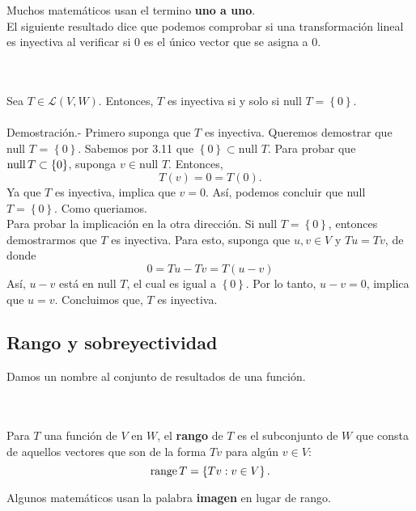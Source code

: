 Muchos matemáticos usan el termino \textbf{uno a uno}.\\

El siguiente resultado dice que podemos comprobar si una transformación lineal es inyectiva al verificar si $0$ es el único vector que se asigna a $0$.

\begin{myteo}\,\\\\
    Sea $T\in \mathcal{L}(V,W)$. Entonces, $T$ es inyectiva si y solo si null $T=\left\{0\right\}$.\\\\
	Demostración.-\; Primero suponga que $T$ es inyectiva. Queremos demostrar que null $T$ = $\left\{0\right\}$. Sabemos por 3.11 que $\left\{0\right\}\subset \mbox{null }T$. Para probar que $\operatorname{null} T \subset \left\{0\right\}$, suponga $v\in \mbox{null }T$. Entonces,
	$$T(v)=0=T(0).$$
	Ya que $T$ es inyectiva, implica que $v=0$. Así, podemos concluir que null $T=\left\{0\right\}$. Como queriamos.\\

	Para probar la implicación en la otra dirección. Si null $T=\left\{0\right\}$, entonces demostrarmos que $T$ es inyectiva. Para esto, suponga que $u,v\in V$ y $Tu=Tv$, de donde
	$$0=Tu-Tv=T(u-v)$$
	Así, $u-v$ está en null $T$, el cual es igual a $\left\{0\right\}$. Por lo tanto, $u-v=0$, implica que $u=v$. Concluimos que, $T$ es inyectiva.
\end{myteo}
\vspace{.5cm}

\subsection*{Rango y sobreyectividad}

Damos un nombre al conjunto de resultados de una función.

\begin{mydef}[Rango]\,\\\\
    Para $T$ una función de $V$ en $W$, el \textbf{rango} de $T$ es el subconjunto de $W$ que consta de aquellos vectores que son de la forma $Tv$ para algún $v\in V$:
$$\operatorname{range} T=\left\{Tv:v\in V\right\}.$$
\end{mydef}

Algunos matemáticos usan la palabra \textbf{imagen} en lugar de rango.\\

